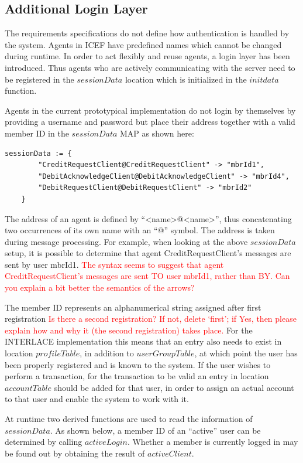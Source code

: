 \subsection{Additional Login Layer}
\label{subsec:impl-login-layer}

The requirements specifications do not define how authentication is handled by the system. Agents in ICEF have predefined names which cannot be changed during runtime. In order to act flexibly and reuse agents, a login layer has been introduced. Thus agents who are actively communicating with the server need to be registered in the $sessionData$ location which is initialized in the $initdata$ function.

Agents in the current prototypical implementation do not login by themselves by providing a username and password but place their address together with a valid member ID in the $sessionData$ MAP as shown here:
\begin{lstlisting}[language=bsl]
	sessionData := {
		"CreditRequestClient@CreditRequestClient" -> "mbrId1",
		"DebitAcknowledgeClient@DebitAcknowledgeClient" -> "mbrId4",
		"DebitRequestClient@DebitRequestClient" -> "mbrId2"
	}
\end{lstlisting}
The address of an agent is defined by ``<name>@<name>'', thus concatenating two occurrences of its own name with an ``@'' symbol. The address is taken during message processing. For example, when looking at the above $sessionData$ setup, it is possible to determine that agent CreditRequestClient's messages are sent by user mbrId1. \textcolor{red}{The syntax seems to suggest that agent CreditRequestClient's messages are sent TO user mbrId1, rather than BY. Can you explain a bit better the semantics of the arrows?}

The member ID represents an alphanumerical string assigned after first registration \textcolor{red}{Is there a second registration? If not, delete `first'; if Yes, then please explain how and why it (the second registration) takes place.} For the INTERLACE implementation this means that an entry also needs to exist in location $profileTable$, in addition to $userGroupTable$, at which point the user has been properly registered and is known to the system. If the user wishes to perform a transaction, for the transaction to be valid an entry in location $accountTable$ should be added for that user, in order to assign an actual account to that user and enable the system to work with it.

At runtime two derived functions are used to read the information of $sessionData$. As shown below, a member ID of an ``active'' user can be determined by calling $activeLogin$. Whether a member is currently logged in may be found out by obtaining the result of $activeClient$.

